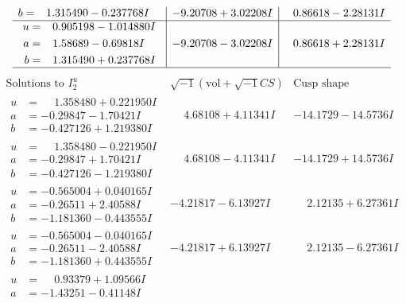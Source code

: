 \documentclass[1p]{elsarticle_modified}
\theoremstyle{definition}
\newcommand{\I}{\sqrt{-1}}
\begin{document}
$$\begin{array}{c|c|c}
\begin{aligned}
b &= \phantom{-}1.315490 - 0.237768 I\end{aligned}
 & -9.20708 + 3.02208 I & \phantom{-}0.86618 - 2.28131 I \\ \hline\begin{aligned}
u &= \phantom{-}0.905198 - 1.014880 I \\
a &= \phantom{-}1.58689 - 0.69818 I \\
b &= \phantom{-}1.315490 + 0.237768 I\end{aligned}
 & -9.20708 - 3.02208 I & \phantom{-}0.86618 + 2.28131 I\\
 \hline 
 \end{array}$$\newpage$$\begin{array}{c|c|c}  
\text{Solutions to }I^u_{2}& \I (\text{vol} + \sqrt{-1}CS) & \text{Cusp shape}\\
 \hline 
\begin{aligned}
u &= \phantom{-}1.358480 + 0.221950 I \\
a &= -0.29847 - 1.70421 I \\
b &= -0.427126 + 1.219380 I\end{aligned}
 & \phantom{-}4.68108 + 4.11341 I & -14.1729 - 14.5736 I \\ \hline\begin{aligned}
u &= \phantom{-}1.358480 - 0.221950 I \\
a &= -0.29847 + 1.70421 I \\
b &= -0.427126 - 1.219380 I\end{aligned}
 & \phantom{-}4.68108 - 4.11341 I & -14.1729 + 14.5736 I \\ \hline\begin{aligned}
u &= -0.565004 + 0.040165 I \\
a &= -0.26511 + 2.40588 I \\
b &= -1.181360 - 0.443555 I\end{aligned}
 & -4.21817 - 6.13927 I & \phantom{-}2.12135 + 6.27361 I \\ \hline\begin{aligned}
u &= -0.565004 - 0.040165 I \\
a &= -0.26511 - 2.40588 I \\
b &= -1.181360 + 0.443555 I\end{aligned}
 & -4.21817 + 6.13927 I & \phantom{-}2.12135 - 6.27361 I \\ \hline\begin{aligned}
u &= \phantom{-}0.93379 + 1.09566 I \\
a &= -1.43251 - 0.41148 I \\

\end{aligned}
\end{array}$$
\end{document}
